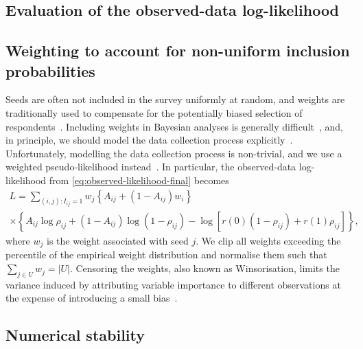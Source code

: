 \documentclass{scrartcl}
\newcommand{\card}[1]{\left|#1\right|}
\newcommand{\seeds}{U}
\begin{document}
\begin{refsection}
\section{Evaluation of the observed-data log-likelihood}

\subsection{Weighting to account for non-uniform inclusion probabilities}

Seeds are often not included in the survey uniformly at random, and weights are traditionally used to compensate for the potentially biased selection of respondents~\cite{Kish1992}. Including weights in Bayesian analyses is generally difficult~\cite{Gelman2007}, and, in principle, we should model the data collection process explicitly~\cite[chapter~8]{Gelman2013}. Unfortunately, modelling the data collection process is non-trivial, and we use a weighted pseudo-likelihood instead~\cite{Pfeffermann1996}. In particular, the observed-data log-likelihood from \cref{eq:observed-likelihood-final} becomes
\begin{multline}
    L = \sum_{(i,j):I_{ij} = 1} w_j\left\{A_{ij} + (1 - A_{ij})w_i\right\}
    \\\times\left\{A_{ij}\log\rho_{ij} + (1-A_{ij})\log(1-\rho_{ij})-\log\left[r(0)(1 - \rho_{ij}) + r(1)\rho_{ij}\right]\right\},\label{eq:survey-weighted-log-likelihood}
\end{multline}
where $w_j$ is the weight associated with seed $j$. We clip all weights exceeding the  percentile of the empirical weight distribution and normalise them such that $\sum_{j\in\seeds}w_j=\card{\seeds}$. Censoring the weights, also known as Winsorisation, limits the variance induced by attributing variable importance to different observations at the expense of introducing a small bias~\cite{Kish1992}.

\subsection{Numerical stability\label{app:numeric-stability}}


\end{refsection}
\end{document}
